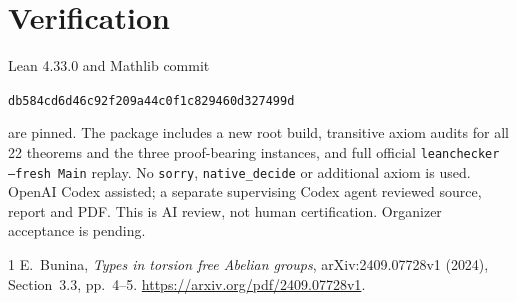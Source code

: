 \documentclass[11pt]{article}
\begin{document}
\section{Verification}
Lean 4.33.0 and Mathlib commit
\begin{center}\small\texttt{db584cd6d46c92f209a44c0f1c829460d327499d}\end{center}
are pinned. The package includes a new root build, transitive axiom
audits for all 22 theorems and the three proof-bearing instances,
and full official \texttt{leanchecker --fresh Main} replay.
No \texttt{sorry}, \texttt{native\_decide} or additional axiom is used.
OpenAI Codex assisted; a separate supervising Codex agent reviewed
source, report and PDF. This is AI review, not human certification.
Organizer acceptance is pending.
\begin{thebibliography}{1}
 E.~Bunina, \emph{Types in torsion free Abelian groups},
arXiv:2409.07728v1 (2024), Section~3.3, pp.~4--5.
\url{https://arxiv.org/pdf/2409.07728v1}.
\end{thebibliography}
\end{document}
